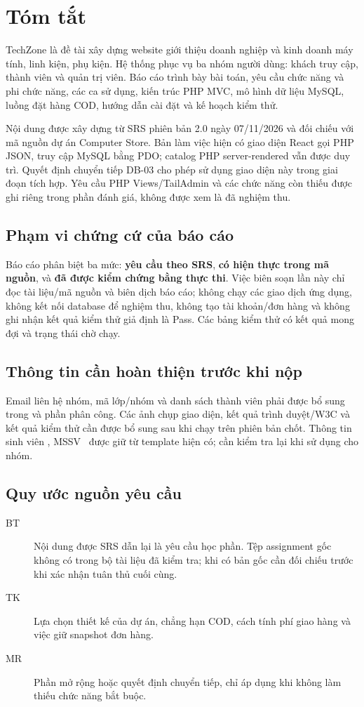 \section*{Tóm tắt}
TechZone là đề tài xây dựng website giới thiệu doanh nghiệp và kinh doanh máy tính, linh kiện, phụ kiện. Hệ thống phục vụ ba nhóm người dùng: khách truy cập, thành viên và quản trị viên. Báo cáo trình bày bài toán, yêu cầu chức năng và phi chức năng, các ca sử dụng, kiến trúc PHP MVC, mô hình dữ liệu MySQL, luồng đặt hàng COD, hướng dẫn cài đặt và kế hoạch kiểm thử.

Nội dung được xây dựng từ SRS phiên bản 2.0 ngày 07/11/2026 và đối chiếu với mã nguồn dự án Computer Store. Bản làm việc hiện có giao diện React gọi PHP JSON, truy cập MySQL bằng PDO; catalog PHP server-rendered vẫn được duy trì. Quyết định chuyển tiếp DB-03 cho phép sử dụng giao diện này trong giai đoạn tích hợp. Yêu cầu PHP Views/TailAdmin và các chức năng còn thiếu được ghi riêng trong phần đánh giá, không được xem là đã nghiệm thu.\cite{srs,repository}

\subsection*{Phạm vi chứng cứ của báo cáo}
Báo cáo phân biệt ba mức: \textbf{yêu cầu theo SRS}, \textbf{có hiện thực trong mã nguồn}, và \textbf{đã được kiểm chứng bằng thực thi}. Việc biên soạn lần này chỉ đọc tài liệu/mã nguồn và biên dịch báo cáo; không chạy các giao dịch ứng dụng, không kết nối database để nghiệm thu, không tạo tài khoản/đơn hàng và không ghi nhận kết quả kiểm thử giả định là Pass. Các bảng kiểm thử có kết quả mong đợi và trạng thái chờ chạy.

\subsection*{Thông tin cần hoàn thiện trước khi nộp}
Email liên hệ nhóm, mã lớp/nhóm và danh sách thành viên phải được bổ sung trong  và phần phân công. Các ảnh chụp giao diện, kết quả trình duyệt/W3C và kết quả kiểm thử cần được bổ sung sau khi chạy trên phiên bản chốt. Thông tin sinh viên \ReportAuthor, MSSV \ReportStudentID\ được giữ từ template hiện có; cần kiểm tra lại khi sử dụng cho nhóm.

\subsection*{Quy ước nguồn yêu cầu}
\begin{description}
\item[BT] Nội dung được SRS dẫn lại là yêu cầu học phần. Tệp assignment gốc không có trong bộ tài liệu đã kiểm tra; khi có bản gốc cần đối chiếu trước khi xác nhận tuân thủ cuối cùng.
\item[TK] Lựa chọn thiết kế của dự án, chẳng hạn COD, cách tính phí giao hàng và việc giữ snapshot đơn hàng.
\item[MR] Phần mở rộng hoặc quyết định chuyển tiếp, chỉ áp dụng khi không làm thiếu chức năng bắt buộc.
\end{description}
\clearpage
